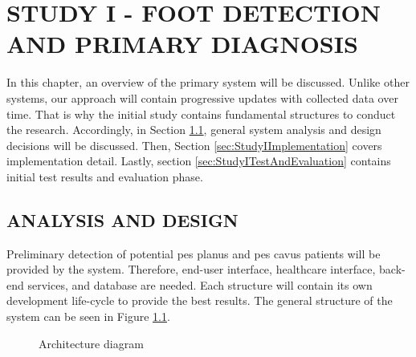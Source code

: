 \chapter{STUDY I - FOOT DETECTION AND PRIMARY DIAGNOSIS}\label{chp:Foot Detection & Primary Diagnosis}

In this chapter, an overview of the primary system will be discussed. Unlike other systems, our approach will contain progressive updates with collected data over time. That is why the initial study contains fundamental structures to conduct the research. Accordingly, in Section \ref{sec:StudyIAnalysisAndDesign}, general system analysis and design decisions will be discussed. Then, Section \ref{sec:StudyIImplementation} covers implementation detail. Lastly, section \ref{sec:StudyITestAndEvaluation} contains initial test results and evaluation phase.

\section{ANALYSIS AND DESIGN}\label{sec:StudyIAnalysisAndDesign}

Preliminary detection of potential pes planus and pes cavus patients will be provided by the system. Therefore, end-user interface, healthcare interface, back-end services, and database are needed. Each structure will contain its own development life-cycle to provide the best results. The general structure of the system can be seen in Figure \ref{fig:GeneralArchitectureDiagram}.

\begin{figure}[htbp]
\centering
{}
\caption{Architecture diagram}
\label{fig:GeneralArchitectureDiagram}
\end{figure}


